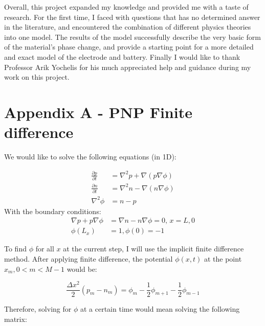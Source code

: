 \documentclass[12pt]{article}
\begin{document}
Overall, this project expanded my knowledge and provided me with a taste of research. For the first time, I faced with questions that has no determined answer in the literature, and encountered the combination of different physics theories into one model. The results of the model successfully describe the very basic form of the material's phase change, and provide a starting point for a more detailed and exact model of the electrode and battery.
Finally I would like to thank Professor Arik Yochelis for his much appreciated help and guidance during my work on this project.

\pagebreak
\section{Appendix A - PNP Finite difference} \label{sec:appendix-a}

We would like to solve the following equations (in 1D):

\begin{align}
    \frac{\partial p}{\partial t} &= \nabla^2 p + \nabla(p\nabla \phi) \\
    \frac{\partial n}{\partial t} &= \nabla^2 n - \nabla(n\nabla \phi) \\
    \nabla^2 \phi &= n - p
\end{align}
With the boundary conditions:
\begin{align}
    \nabla p + p \nabla \phi &= \nabla n - n \nabla \phi = 0, \, x=L,0 \\
    \phi(L_x) &= 1, \phi(0) = -1
\end{align}

To find $\phi$ for all $x$ at the current step, I will use the implicit finite difference method.
After applying finite difference, the potential $\phi(x,t)$ at the point $x_m, 0<m<M-1$ would be:

\begin{equation}
    \frac{\Delta x^2}{2}(p_m - n_m) = \phi_m -\frac{1}{2} \phi_{m+1} -\frac{1}{2} \phi_{m-1}
\end{equation}

Therefore, solving for $\phi$ at a certain time would mean solving the following matrix:
\end{document}
